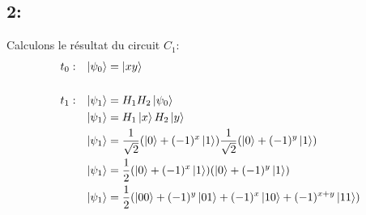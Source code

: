 \documentclass{article}
\begin{document}
\subsection*{2:}
Calculons le résultat du circuit $C_1$:
\begin{align*}
&t_0:&  \ket{\psi_0} &= \ket{xy} \\ \\
&t_1:&  \ket{\psi_1} &= H_1H_2\ket{\psi_0} \\
&&      \ket{\psi_1} &= H_1\ket{x}H_2\ket{y} \\
&&      \ket{\psi_1} &= \frac{1}{\sqrt{2}}(\ket{0} + (-1)^x\ket{1})\frac{1}{\sqrt{2}}(\ket{0} + (-1)^y\ket{1}) \\
&&      \ket{\psi_1} &= \frac{1}{2}(\ket{0} + (-1)^x\ket{1})(\ket{0} + (-1)^y\ket{1}) \\
&&      \ket{\psi_1} &= \frac{1}{2}(\ket{00} + (-1)^y\ket{01} + (-1)^x\ket{10} + (-1)^{x + y}\ket{11}) \\ \\
\end{align*}
\newpage
\end{document}
